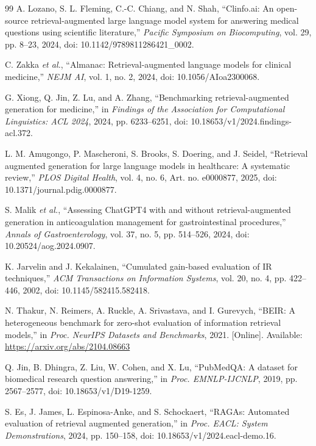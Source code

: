 \begin{thebibliography}{99}
A. Lozano, S. L. Fleming, C.-C. Chiang, and N. Shah, ``Clinfo.ai: An open-source retrieval-augmented large language model system for answering medical questions using scientific literature,'' \textit{Pacific Symposium on Biocomputing}, vol. 29, pp. 8--23, 2024, doi: 10.1142/9789811286421\_0002.

C. Zakka \textit{et al.}, ``Almanac: Retrieval-augmented language models for clinical medicine,'' \textit{NEJM AI}, vol. 1, no. 2, 2024, doi: 10.1056/AIoa2300068.

G. Xiong, Q. Jin, Z. Lu, and A. Zhang, ``Benchmarking retrieval-augmented generation for medicine,'' in \textit{Findings of the Association for Computational Linguistics: ACL 2024}, 2024, pp. 6233--6251, doi: 10.18653/v1/2024.findings-acl.372.

L. M. Amugongo, P. Mascheroni, S. Brooks, S. Doering, and J. Seidel, ``Retrieval augmented generation for large language models in healthcare: A systematic review,'' \textit{PLOS Digital Health}, vol. 4, no. 6, Art. no. e0000877, 2025, doi: 10.1371/journal.pdig.0000877.

S. Malik \textit{et al.}, ``Assessing ChatGPT4 with and without retrieval-augmented generation in anticoagulation management for gastrointestinal procedures,'' \textit{Annals of Gastroenterology}, vol. 37, no. 5, pp. 514--526, 2024, doi: 10.20524/aog.2024.0907.

K. Jarvelin and J. Kekalainen, ``Cumulated gain-based evaluation of IR techniques,'' \textit{ACM Transactions on Information Systems}, vol. 20, no. 4, pp. 422--446, 2002, doi: 10.1145/582415.582418.

N. Thakur, N. Reimers, A. Ruckle, A. Srivastava, and I. Gurevych, ``BEIR: A heterogeneous benchmark for zero-shot evaluation of information retrieval models,'' in \textit{Proc. NeurIPS Datasets and Benchmarks}, 2021. [Online]. Available: \url{https://arxiv.org/abs/2104.08663}

Q. Jin, B. Dhingra, Z. Liu, W. Cohen, and X. Lu, ``PubMedQA: A dataset for biomedical research question answering,'' in \textit{Proc. EMNLP-IJCNLP}, 2019, pp. 2567--2577, doi: 10.18653/v1/D19-1259.

S. Es, J. James, L. Espinosa-Anke, and S. Schockaert, ``RAGAs: Automated evaluation of retrieval augmented generation,'' in \textit{Proc. EACL: System Demonstrations}, 2024, pp. 150--158, doi: 10.18653/v1/2024.eacl-demo.16.


\end{thebibliography}

